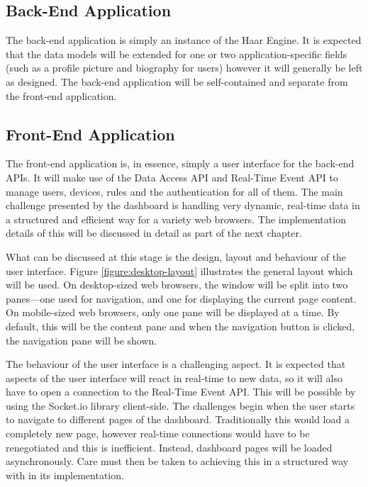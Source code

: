     \subsection{Back-End Application}
      The back-end application is simply an instance of the Haar Engine. It is expected that the data models will be extended for one or two application-specific fields (such as a profile picture and biography for users) however it will generally be left as designed. The back-end application will be self-contained and separate from the front-end application. 

    \subsection{Front-End Application}
      The front-end application is, in essence, simply a user interface for the back-end APIs. It will make use of the Data Access API and Real-Time Event API to manage users, devices, rules and the authentication for all of them. The main challenge presented by the dashboard is handling very dynamic, real-time data in a structured and efficient way for a variety web browsers. The implementation details of this will be discussed in detail as part of the next chapter.

      What can be discussed at this stage is the design, layout and behaviour of the user interface. Figure \ref{figure:desktop-layout} illustrates the general layout which will be used. On desktop-sized web browsers, the window will be split into two panes---one used for navigation, and one for displaying the current page content. On mobile-sized web browsers, only one pane will be displayed at a time. By default, this will be the content pane and when the navigation button is clicked, the navigation pane will be shown.

      The behaviour of the user interface is a challenging aspect. It is expected that aspects of the user interface will react in real-time to new data, so it will also have to open a connection to the Real-Time Event API. This will be possible by using the Socket.io library client-side. The challenges begin when the user starts to navigate to different pages of the dashboard. Traditionally this would load a completely new page, however real-time connections would have to be renegotiated and this is inefficient. Instead, dashboard pages will be loaded asynchronously. Care must then be taken to achieving this in a structured way with in its implementation.

